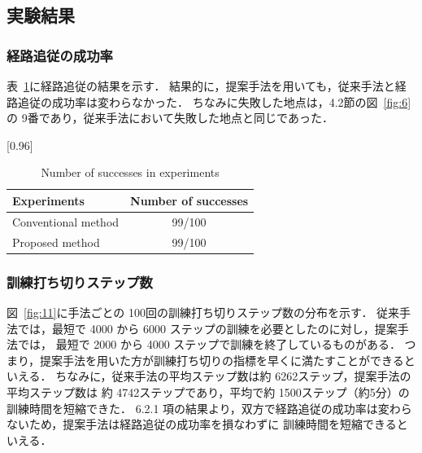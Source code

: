 \documentclass{jarticle}
\renewcommand{\figurename}{図~}
\renewcommand{\tablename}{表~}
\newcommand{\figref}[1]{\figurename\ref{#1}}
\newcommand{\tabref}[1]{\tablename\ref{#1}}
\begin{document}
\subsection{実験結果}
\subsubsection{経路追従の成功率}
\tabref{table:2}に経路追従の結果を示す．
結果的に，提案手法を用いても，従来手法と経路追従の成功率は変わらなかった．
ちなみに失敗した地点は，4.2節の\figref{fig:6}の 9番であり，従来手法において失敗した地点と同じであった．

\begin{table}[h!]
  \centering
  \caption{Number of successes in experiments}
  \label{table:2}
    \scalebox{0.96}[0.96] {
    \begin{tabular}{|l||c|}
      \hline
      Experiments & Number of successes \\
      \hline\hline
      Conventional method & 99/100 \\
      \hline
      Proposed method & 99/100\\
      \hline 
    \end{tabular} }
\end{table}

\subsubsection{訓練打ち切りステップ数}
\figref{fig:11}に手法ごとの 100回の訓練打ち切りステップ数の分布を示す．
従来手法では，最短で 4000 から 6000 ステップの訓練を必要としたのに対し，提案手法では，
最短で 2000 から 4000 ステップで訓練を終了しているものがある．
つまり，提案手法を用いた方が訓練打ち切りの指標を早くに満たすことができるといえる．
ちなみに，従来手法の平均ステップ数は約 6262ステップ，提案手法の平均ステップ数は
約 4742ステップであり，平均で約 1500ステップ（約5分）の訓練時間を短縮できた．
6.2.1 項の結果より，双方で経路追従の成功率は変わらないため，提案手法は経路追従の成功率を損なわずに
訓練時間を短縮できるといえる．
\end{document}
